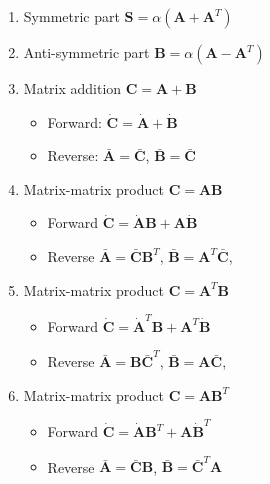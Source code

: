 \documentclass{article}
\begin{document}
\begin{enumerate}
        \item Symmetric part $\mathbf{S} = \alpha(\mathbf{A} + \mathbf{A}^{T})$
        \item Anti-symmetric part $\mathbf{B} = \alpha (\mathbf{A} - \mathbf{A}^{T})$

        \item Matrix addition $\mathbf{C} = \mathbf{A} + \mathbf{B}$
        \begin{itemize}
            \item Forward: $\dot{\mathbf{C}} =  \dot{\mathbf{A}} + \dot{\mathbf{B}}$
            \item Reverse: $\bar{\mathbf{A}} =  \bar{\mathbf{C}}$, $\bar{\mathbf{B}} = \bar{\mathbf{C}}$
        \end{itemize}


        \item Matrix-matrix product $\mathbf{C} = \mathbf{A} \mathbf{B}$
        \begin{itemize}
            \item Forward $\dot{\mathbf{C}} = \dot{\mathbf{A}} \mathbf{B} + \mathbf{A} \dot{\mathbf{B}}$
            \item Reverse $\bar{\mathbf{A}} = \bar{\mathbf{C}} \mathbf{B}^{T}$,  $\bar{\mathbf{B}} = \mathbf{A}^{T} \bar{\mathbf{C}}$,
        \end{itemize}

        \item Matrix-matrix product $\mathbf{C} = \mathbf{A}^{T} \mathbf{B}$
        \begin{itemize}
            \item Forward $\dot{\mathbf{C}} = \dot{\mathbf{A}}^{T} \mathbf{B} + \mathbf{A}^{T} \dot{\mathbf{B}}$
            \item Reverse $\bar{\mathbf{A}} = \mathbf{B} \bar{\mathbf{C}}^{T}$,  $\bar{\mathbf{B}} = \mathbf{A} \bar{\mathbf{C}}$,
        \end{itemize}

        \item Matrix-matrix product $\mathbf{C} = \mathbf{A} \mathbf{B}^{T}$
        \begin{itemize}
            \item Forward $\dot{\mathbf{C}} = \dot{\mathbf{A}} \mathbf{B}^{T} + \mathbf{A} \dot{\mathbf{B}}^{T}$
            \item Reverse $\bar{\mathbf{A}} = \bar{\mathbf{C}} \mathbf{B}$, $\bar{\mathbf{B}} = \bar{\mathbf{C}}^{T} \mathbf{A}$
        \end{itemize}


\end{enumerate}
\end{document}
